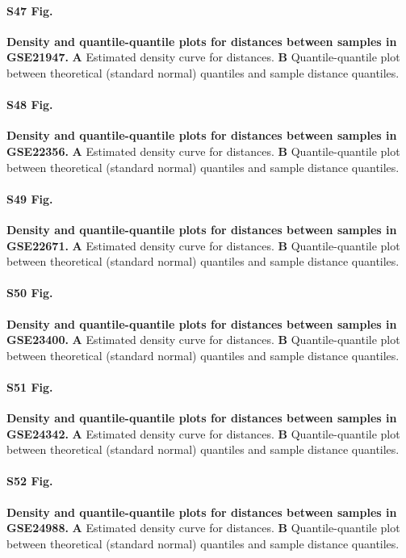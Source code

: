 \documentclass[10pt,letterpaper]{article}
\begin{document}
\paragraph*{S47 Fig.}
\hypertarget{S47_Fig}{
{\bf Density and quantile-quantile plots for distances between samples in GSE21947.} \textbf{A} Estimated density curve for distances. \textbf{B} Quantile-quantile plot between theoretical (standard normal) quantiles and sample distance quantiles.}

\paragraph*{S48 Fig.}
\hypertarget{S48_Fig}{
{\bf Density and quantile-quantile plots for distances between samples in GSE22356.} \textbf{A} Estimated density curve for distances. \textbf{B} Quantile-quantile plot between theoretical (standard normal) quantiles and sample distance quantiles.}

\paragraph*{S49 Fig.}
\hypertarget{S49_Fig}{
{\bf Density and quantile-quantile plots for distances between samples in GSE22671.} \textbf{A} Estimated density curve for distances. \textbf{B} Quantile-quantile plot between theoretical (standard normal) quantiles and sample distance quantiles.}

\paragraph*{S50 Fig.}
\hypertarget{S50_Fig}{
{\bf Density and quantile-quantile plots for distances between samples in GSE23400.} \textbf{A} Estimated density curve for distances. \textbf{B} Quantile-quantile plot between theoretical (standard normal) quantiles and sample distance quantiles.}

\paragraph*{S51 Fig.}
\hypertarget{S51_Fig}{
{\bf Density and quantile-quantile plots for distances between samples in GSE24342.} \textbf{A} Estimated density curve for distances. \textbf{B} Quantile-quantile plot between theoretical (standard normal) quantiles and sample distance quantiles.}

\paragraph*{S52 Fig.}
\hypertarget{S52_Fig}{
{\bf Density and quantile-quantile plots for distances between samples in GSE24988.} \textbf{A} Estimated density curve for distances. \textbf{B} Quantile-quantile plot between theoretical (standard normal) quantiles and sample distance quantiles.}
\end{document}
